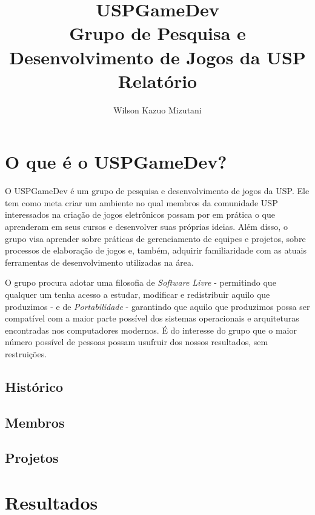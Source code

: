 \documentclass[12pt,onecolumn,a4paper]{article}
\begin{document}
\begin{titlepage}

    \title{
        \bf
        \Huge  USPGameDev \\
        \large Grupo de Pesquisa e Desenvolvimento de Jogos da USP \\
        \LARGE Relatório
    }
    \author{Wilson Kazuo Mizutani}
    
    \maketitle
    
    \thispagestyle{empty}
    
\end{titlepage}

\tableofcontents

\clearpage

\section{\LARGE O que é o USPGameDev?}

    O USPGameDev é um grupo de pesquisa e desenvolvimento de jogos da USP. Ele tem como meta criar
    um ambiente no qual membros da comunidade USP interessados na criação de jogos eletrônicos
    possam por em prática o que aprenderam em seus cursos e desenvolver suas próprias ideias. Além
    disso, o grupo visa aprender sobre práticas de gerenciamento de equipes e projetos, sobre
    processos de elaboração de jogos e, também, adquirir familiaridade com as atuais ferramentas de
    desenvolvimento utilizadas na área.
    
    O grupo procura adotar uma filosofia de {\it Software Livre} - permitindo que qualquer um tenha
    acesso a estudar, modificar e redistribuir aquilo que produzimos - e de {\it Portabilidade} -
    garantindo que aquilo que produzimos possa ser compatível com a maior parte possível dos
    sistemas operacionais e arquiteturas encontradas nos computadores modernos. É do interesse do
    grupo que o maior número possível de pessoas possam usufruir dos nossos resultados, sem
    restruições.

\subsection{Histórico}

\subsection{Membros}

\subsection{Projetos}

\section{\LARGE Resultados}

\end{document}
